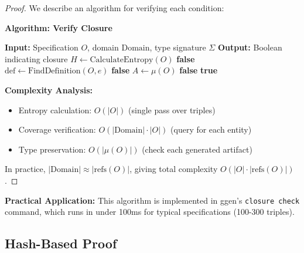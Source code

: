 \begin{proof}
    We describe an algorithm for verifying each condition:

    \textbf{Algorithm: Verify Closure}
    \begin{algorithm}
        \caption{Ontological Closure Verification}
        \begin{algorithmic}[1]
            \State \textbf{Input:} Specification \(O\), domain \(\text{Domain}\), type signature \(\Sigma\)
            \State \textbf{Output:} Boolean indicating closure
            \State
            \State {}
            \State \(H \leftarrow \text{CalculateEntropy}(O)\)
             \Return \textbf{false} \EndIf
            \State
            \State {}
                \State \(\text{def} \leftarrow \text{FindDefinition}(O, e)\)
                 \Return \textbf{false} \EndIf
            \EndFor
            \State
            \State {}
            \State \(A \leftarrow \mu(O)\)
                 \Return \textbf{false} \EndIf
            \EndFor
            \State
            \State \Return \textbf{true}
        \end{algorithmic}
    \end{algorithm}

    \textbf{Complexity Analysis:}
    \begin{itemize}
        \item Entropy calculation: \(O(|O|)\) (single pass over triples)
        \item Coverage verification: \(O(|\text{Domain}| \cdot |O|)\) (query for each entity)
        \item Type preservation: \(O(|\mu(O)|)\) (check each generated artifact)
    \end{itemize}

    In practice, \(|\text{Domain}| \approx |\text{refs}(O)|\), giving total complexity \(O(|O| \cdot |\text{refs}(O)|)\).
\end{proof}

\textbf{Practical Application:} This algorithm is implemented in ggen's \texttt{closure check} command, which runs in under 100ms for typical specifications (100-300 triples).

\subsection{Hash-Based Proof}

